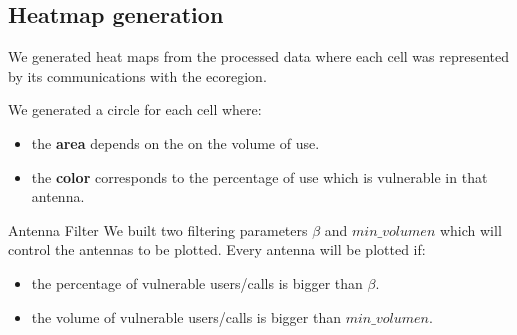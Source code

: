 \subsection{Heatmap generation}

		We generated heat maps from the processed data where each cell was represented by its communications with
		the ecoregion.
		
		We generated a circle for each cell where:
		\begin{itemize}
			\item the \textbf{area} depends on the on the volume of use.
			\item the \textbf{color} corresponds to the percentage of use which is vulnerable in that antenna.
		\end{itemize}
		
		\begin{block}{Antenna Filter}
		We built two filtering parameters $\beta$ and $min\_volumen$ which will control the antennas to be plotted.
		Every antenna will be plotted if:
		\begin{itemize}
			\item the percentage of vulnerable users/calls is bigger than  $\beta$.
			\item the volume of vulnerable users/calls is bigger than $min\_volumen$. 
		\end{itemize}
		
		
		
	\end{block}